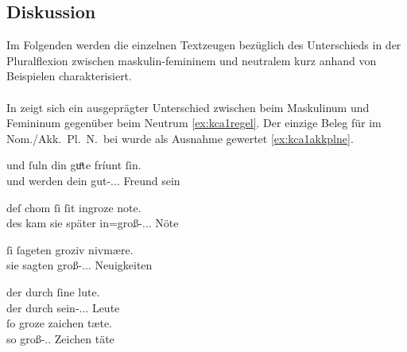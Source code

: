 \subsection{Diskussion}
\label{subsec:kc_adjflex_disc}

Im Folgenden werden die einzelnen Textzeugen bezüglich des Unterschieds in der
Plural\-flexion zwischen maskulin-femininem  und neutralem
 kurz anhand von Beispielen charakterisiert.

\paragraph{\citet{kc:A1}}
In \citet{kc:A1} zeigt sich ein ausgeprägter Unterschied zwischen
 beim Maskulinum und Femininum gegenüber  beim Neutrum
\cref{ex:kca1regel}. Der einzige Beleg für  im Nom./Akk.\ Pl.\ N.\ bei
  wurde als Ausnahme gewertet \cref{ex:kca1akkplne}.

\begin{exe}
\ex \label{ex:kca1regel}
	\begin{xlist}
	\ex \label{ex:kca1regel_1}
		\gll und ſuln din guͦte fríunt ſin. \\
			und werden dein gut-\Nom.\Pl.\MascA.\St{} Freund sein \\
		\begin{taggedline}{\parencites[\pno~13\rb, 3]{kc:A1}[vgl.][3089]{schroeder1895}}
		\trans {}
		\end{taggedline}

	\ex \label{ex:kca1regel_2}
		\gll deſ chom ſi ſit ingroze note. \\
			des kam sie später in=groß-\Acc.\Pl.\FemI.\St{} Nöte \\
		\begin{taggedline}{\parencites[\pno~49\vb, 13]{kc:A1}[vgl.][11413]{schroeder1895}}
		\trans {}
		\end{taggedline}

	\ex \label{ex:kca1regel_3}
		\gll ſi ſageten groziv nivmære. \\
			sie sagten groß-\Acc.\Pl.\NeutI.\St{} Neuigkeiten \\
		\begin{taggedline}{\parencites[\pno~33\rb, 33]{kc:A1}[vgl.][7710]{schroeder1895}}
		\trans {}
		\end{taggedline}
	\end{xlist}

\ex\label{ex:kca1akkplne}
	\gll der durch ſine lute. \\
		der durch sein-\Acc.\Pl.\MascA.\St{} Leute \\
\sn \gll ſo groze zaichen tæte. \\
		so groß-\Acc.\Pl.\NeutI{} Zeichen täte \\
	\begin{taggedline}{\parencites[\pno~45\rb, 10--11]{kc:A1}[vgl.][10331--10332]{schroeder1895}}
		\trans {}
	\end{taggedline}
\end{exe}

